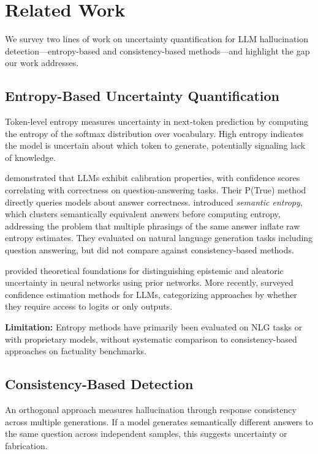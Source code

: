 \section{Related Work}
\label{sec:related}

We survey two lines of work on uncertainty quantification for LLM hallucination detection---entropy-based and consistency-based methods---and highlight the gap our work addresses.

\subsection{Entropy-Based Uncertainty Quantification}

Token-level entropy measures uncertainty in next-token prediction by computing the entropy of the softmax distribution over vocabulary. High entropy indicates the model is uncertain about which token to generate, potentially signaling lack of knowledge.

\citet{kadavath2022language} demonstrated that LLMs exhibit calibration properties, with confidence scores correlating with correctness on question-answering tasks. Their P(True) method directly queries models about answer correctness. \citet{kuhn2023semantic} introduced \emph{semantic entropy}, which clusters semantically equivalent answers before computing entropy, addressing the problem that multiple phrasings of the same answer inflate raw entropy estimates. They evaluated on natural language generation tasks including question answering, but did not compare against consistency-based methods.

\citet{malinin2018predictive} provided theoretical foundations for distinguishing epistemic and aleatoric uncertainty in neural networks using prior networks. More recently, \citet{xiong2023llmconfidence} surveyed confidence estimation methods for LLMs, categorizing approaches by whether they require access to logits or only outputs.

\textbf{Limitation:} Entropy methods have primarily been evaluated on NLG tasks or with proprietary models, without systematic comparison to consistency-based approaches on factuality benchmarks.

\subsection{Consistency-Based Detection}

An orthogonal approach measures hallucination through response consistency across multiple generations. If a model generates semantically different answers to the same question across independent samples, this suggests uncertainty or fabrication.


